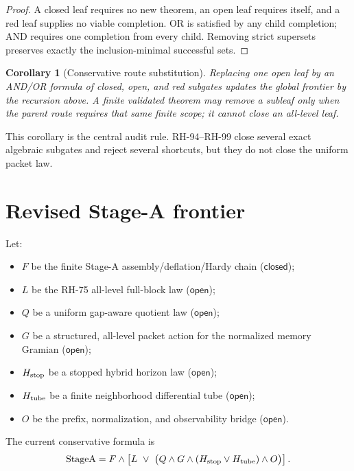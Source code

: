 \documentclass[11pt]{article}
\newtheorem{corollary}[theorem]{Corollary}
\theoremstyle{definition}
\theoremstyle{remark}
\newcommand{\mathsfclosed}{\mathsf{closed}}
\newcommand{\mathsfopen}{\mathsf{open}}
\begin{document}
\begin{proof}
A closed leaf requires no new theorem, an open leaf requires itself, and a red
leaf supplies no viable completion.  OR is satisfied by any child
completion; AND requires one completion from every child.  Removing strict
supersets preserves exactly the inclusion-minimal successful sets.
\end{proof}

\begin{corollary}[Conservative route substitution]
Replacing one open leaf by an AND/OR formula of closed, open, and red
subgates updates the global frontier by the recursion above.  A finite
validated theorem may remove a subleaf only when the parent route requires
that same finite scope; it cannot close an all-level leaf.
\end{corollary}

This corollary is the central audit rule.  RH-94--RH-99 close several exact
algebraic subgates and reject several shortcuts, but they do not close the
uniform packet law.

\section{Revised Stage-A frontier}
\label{sec:stageA}

Let:
\begin{itemize}[leftmargin=2em]
\item $F$ be the finite Stage-A assembly/deflation/Hardy chain
($\mathsfclosed$);
\item $L$ be the RH-75 all-level full-block law ($\mathsfopen$);
\item $Q$ be a uniform gap-aware quotient law ($\mathsfopen$);
\item $G$ be a structured, all-level packet action for the normalized memory
Gramian ($\mathsfopen$);
\item $H_{\rm stop}$ be a stopped hybrid horizon law ($\mathsfopen$);
\item $H_{\rm tube}$ be a finite neighborhood differential tube
($\mathsfopen$);
\item $O$ be the prefix, normalization, and observability bridge
($\mathsfopen$).
\end{itemize}
The current conservative formula is
\begin{equation}
 \mathrm{StageA}
 =
 F\wedge
 \left[
 L\ \vee\
 \bigl(Q\wedge G\wedge
 (H_{\rm stop}\vee H_{\rm tube})\wedge O\bigr)
 \right].
 \label{eq:stageA}
\end{equation}
\end{document}
